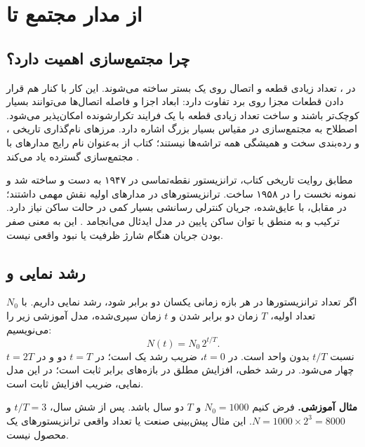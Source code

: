 \section{از مدار مجتمع تا }
\label{sec:ch1-history}
\subsection{چرا مجتمع‌سازی اهمیت دارد؟}
در ، تعداد زیادی قطعه و اتصال روی یک بستر
ساخته می‌شوند. این کار با کنار هم قرار دادن قطعات مجزا روی برد تفاوت دارد:
ابعاد اجزا و فاصله اتصال‌ها می‌توانند بسیار کوچک‌تر باشند و ساخت تعداد زیادی
قطعه با یک فرایند تکرارشونده امکان‌پذیر می‌شود.
اصطلاح  به مجتمع‌سازی در مقیاس بسیار
بزرگ اشاره دارد. مرزهای نام‌گذاری تاریخی ،  و 
رده‌بندی سخت و همیشگی همه تراشه‌ها نیستند؛ کتاب از  به‌عنوان نام رایج
مدارهای با مجتمع‌سازی گسترده یاد می‌کند \cite[بخش ]{weste}.

مطابق روایت تاریخی کتاب، ترانزیستور نقطه‌تماسی در ۱۹۴۷ به دست
 و  ساخته شد و نمونه نخست 
را  در ۱۹۵۸ ساخت.
ترانزیستورهای  در مدارهای اولیه نقش مهمی داشتند؛
در مقابل،  با  عایق‌شده، جریان کنترلی رسانشی بسیار کمی
در حالت ساکن نیاز دارد. ترکیب  و  به منطق 
با توان ساکن پایین در مدل ایدئال می‌انجامد
\cite[صفحات چاپی ۱ تا ۳]{weste}\cite[اسلایدهای ۴ تا ۸]{intro}.
این به معنی صفر بودن جریان هنگام شارژ ظرفیت  یا نبود  واقعی نیست.

\subsection{رشد نمایی و }
اگر تعداد ترانزیستورها در هر بازه زمانی یکسان دو برابر شود، رشد نمایی داریم.
با \(N_0\) تعداد اولیه، \(T\) زمان دو برابر شدن و \(t\) زمان سپری‌شده، مدل آموزشی زیر را می‌نویسیم:
\begin{equation}\label{eq:ch1-doubling}
N(t)=N_0\,2^{t/T}.
\end{equation}
نسبت \(t/T\) بدون واحد است. در \(t=0\)، ضریب رشد یک است؛ در \(t=T\)
دو و در \(t=2T\) چهار می‌شود. در رشد خطی، افزایش مطلق در بازه‌های برابر ثابت است؛
در این مدل نمایی، ضریب افزایش ثابت است.

\textbf{مثال آموزشی.} فرض کنیم \(N_0=1000\) و \(T\) دو سال باشد.
پس از شش سال، \(t/T=3\) و \(N=1000\times2^3=8000\).
این مثال پیش‌بینی صنعت یا تعداد واقعی ترانزیستورهای یک محصول نیست.


